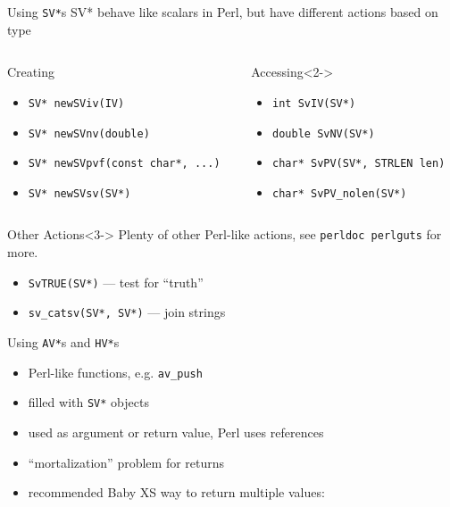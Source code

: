 \documentclass{beamer}
\providecommand{\code}[1]{{\texttt{\scriptsize{#1}}}}
\begin{document}
\begin{frame}{Using \texttt{SV*}s}
  SV* behave like scalars in Perl, but have different actions based on type
  \begin{columns}
    \begin{column}{0.49\linewidth}
      \begin{block}{Creating}
        \begin{itemize}
          \item \code{SV* newSViv(IV)}
          \item \code{SV* newSVnv(double)}
          \item \code{SV* newSVpvf(const char*, ...)}
          \item \code{SV* newSVsv(SV*)}
        \end{itemize}
      \end{block}
    \end{column}
    \begin{column}{0.49\linewidth}
      \begin{block}{Accessing}<2->
        \begin{itemize}
          \item \code{int SvIV(SV*)}
          \item \code{double SvNV(SV*)}
          \item \code{char* SvPV(SV*, STRLEN len)}
          \item \code{char* SvPV\_nolen(SV*)}
        \end{itemize}
      \end{block}
    \end{column}
  \end{columns}
  \begin{block}{Other Actions}<3->
    Plenty of other Perl-like actions, see \code{perldoc perlguts} for more.
    \begin{itemize}
      \item \code{SvTRUE(SV*)} --- test for ``truth''
      \item \code{sv\_catsv(SV*, SV*)} --- join strings
    \end{itemize}
  \end{block}
\end{frame}

\begin{frame}{Using \texttt{AV*}s and \texttt{HV*}s}
  \begin{itemize}
    \item Perl-like functions, e.g. \code{av\_push}
    \item filled with \code{SV*} objects
    \item used as argument or return value, Perl uses references
    \item ``mortalization'' problem for returns
    \item recommended Baby XS way to return multiple values:
  \end{itemize}
  \vfill
  \begin{block}{}
    \scriptsize
    
  \end{block}
\end{frame}
\end{document}

